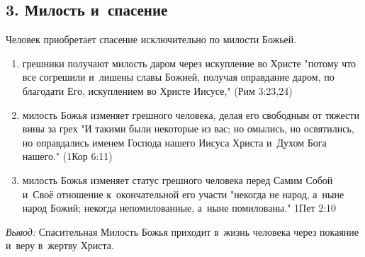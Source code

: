 \documentclass[a4paper,12pt]{article}
\begin{document}
\subsection{3. Милость и~спасение}
Человек приобретает спасение исключительно по милости Божьей.
\begin{enumerate}
    \item грешники получают милость даром через искупление во Христе "потому что все согрешили и~лишены славы Божией, получая оправдание даром, по благодати Его, искуплением во Христе Иисусе," (Рим 3:23,24)
    \item милость Божья изменяет грешного человека, делая его свободным от тяжести вины за грех "И такими были некоторые из вас; но омылись, но освятились, но оправдались именем Господа нашего Иисуса Христа и~Духом Бога нашего." (1Кор 6:11)
    \item милость Божья изменяет статус грешного человека перед Самим Собой и~Своё отношение к~окончательной его участи "некогда не народ, а~ныне народ Божий; некогда непомилованные, а~ныне помилованы."  1Пет 2:10
\end{enumerate}

\noindent \emph{Вывод:} Спасительная Милость Божья приходит в~жизнь человека через покаяние и~веру в~жертву Христа. 
\end{document}
